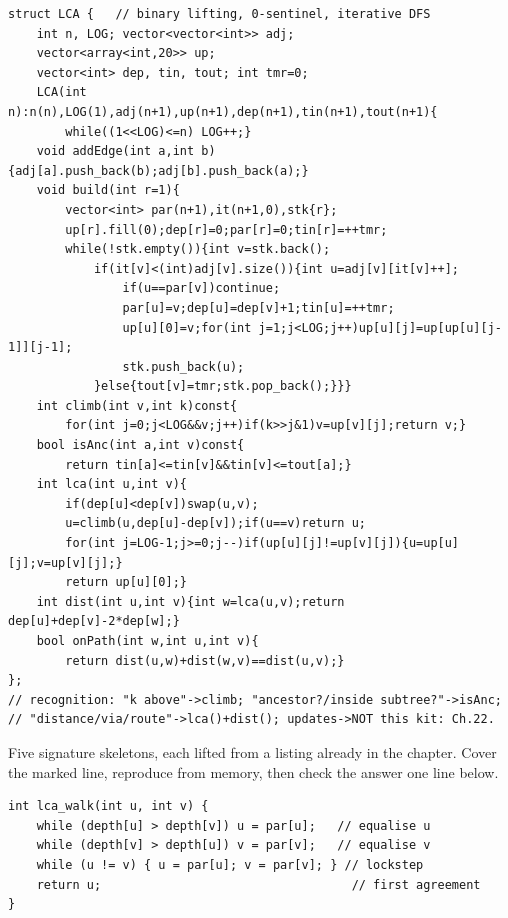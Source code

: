 \begin{lstlisting}[caption={Chapter 16 kit: the lifting machine, complete and production-shaped}, label={lst:c11-kit}]
struct LCA {   // binary lifting, 0-sentinel, iterative DFS
    int n, LOG; vector<vector<int>> adj;
    vector<array<int,20>> up;
    vector<int> dep, tin, tout; int tmr=0;
    LCA(int n):n(n),LOG(1),adj(n+1),up(n+1),dep(n+1),tin(n+1),tout(n+1){
        while((1<<LOG)<=n) LOG++;}
    void addEdge(int a,int b){adj[a].push_back(b);adj[b].push_back(a);}
    void build(int r=1){
        vector<int> par(n+1),it(n+1,0),stk{r};
        up[r].fill(0);dep[r]=0;par[r]=0;tin[r]=++tmr;
        while(!stk.empty()){int v=stk.back();
            if(it[v]<(int)adj[v].size()){int u=adj[v][it[v]++];
                if(u==par[v])continue;
                par[u]=v;dep[u]=dep[v]+1;tin[u]=++tmr;
                up[u][0]=v;for(int j=1;j<LOG;j++)up[u][j]=up[up[u][j-1]][j-1];
                stk.push_back(u);
            }else{tout[v]=tmr;stk.pop_back();}}}
    int climb(int v,int k)const{
        for(int j=0;j<LOG&&v;j++)if(k>>j&1)v=up[v][j];return v;}
    bool isAnc(int a,int v)const{
        return tin[a]<=tin[v]&&tin[v]<=tout[a];}
    int lca(int u,int v){
        if(dep[u]<dep[v])swap(u,v);
        u=climb(u,dep[u]-dep[v]);if(u==v)return u;
        for(int j=LOG-1;j>=0;j--)if(up[u][j]!=up[v][j]){u=up[u][j];v=up[v][j];}
        return up[u][0];}
    int dist(int u,int v){int w=lca(u,v);return dep[u]+dep[v]-2*dep[w];}
    bool onPath(int w,int u,int v){
        return dist(u,w)+dist(w,v)==dist(u,v);}
};
// recognition: "k above"->climb; "ancestor?/inside subtree?"->isAnc;
// "distance/via/route"->lca()+dist(); updates->NOT this kit: Ch.22.
\end{lstlisting}


Five signature skeletons, each lifted from a listing already in the
chapter. Cover the marked line, reproduce from memory, then check the
answer one line below.

\begin{lstlisting}[caption={Drill 1 -- the naive walk (from lst:c11-naive)}]
int lca_walk(int u, int v) {
    while (depth[u] > depth[v]) u = par[u];   // equalise u
    while (depth[v] > depth[u]) v = par[v];   // equalise v
    while (u != v) { u = par[u]; v = par[v]; } // lockstep
    return u;                                   // first agreement
}
\end{lstlisting}

